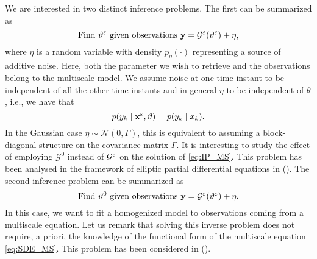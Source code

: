 \documentclass[10pt]{article}
\begin{document}
We are interested in two distinct inference problems. The first can be summarized as
\begin{equation}\label{eq:IP_MS}
	\text{Find } \vartheta^\varepsilon \text{ given observations } \mathbf y = \mathcal G^\varepsilon(\vartheta^\varepsilon) + \eta,
\end{equation}
where $\eta$ is a random variable with density $p_\eta(\cdot)$ representing a source of additive noise. Here, both the parameter we wish to retrieve and the observations belong to the multiscale model. We assume noise at one time instant to be independent of all the other time instants and in general $\eta$ to be independent of $\theta$, i.e., we have that
\begin{equation}\label{eq:NoiseIndependence}
	p(y_k \mid \mathbf x^\varepsilon, \vartheta) = p(y_k \mid x_k). 
\end{equation}
In the Gaussian case $\eta \sim \mathcal N(0, \Gamma)$, this is equivalent to assuming a block-diagonal structure on the covariance matrix $\Gamma$. It is interesting to study the effect of employing $\mathcal G^0$ instead of $\mathcal G^\varepsilon$ on the solution of \eqref{eq:IP_MS}. This problem has been analysed in the framework of elliptic partial differential equations in \cite{AbD17, AbD18, NPS12} (). The second inference problem can be summarized as
\begin{equation}\label{eq:IP_HOM}
\text{Find } \vartheta^0 \text{ given observations } \mathbf y = \mathcal G^\varepsilon(\vartheta^\varepsilon) + \eta.
\end{equation}
In this case, we want to fit a homogenized model to observations coming from a multiscale equation. Let us remark that solving this inverse problem does not require, a priori, the knowledge of the functional form of the multiscale equation \eqref{eq:SDE_MS}. This problem has been considered in \cite{PaS07} ().
\end{document}
